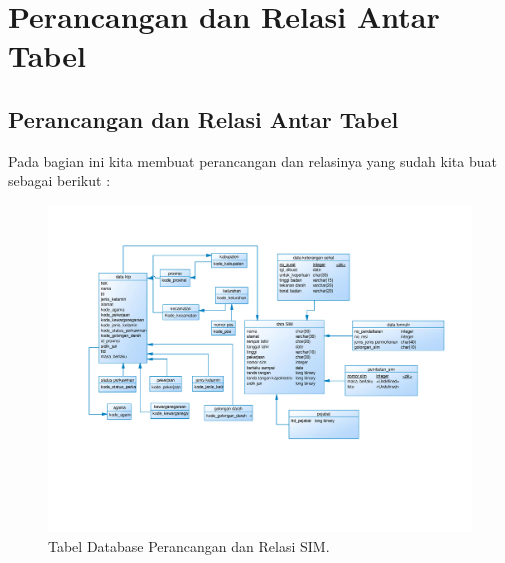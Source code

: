 \chapter{Perancangan dan Relasi Antar Tabel}

\section{Perancangan dan Relasi Antar Tabel}
Pada bagian ini kita membuat perancangan dan relasinya yang sudah kita buat sebagai berikut : 
\begin{figure}[H]
	\centering
	\includegraphics[width=12cm]{figures/relasii.jpg}
	\caption{Tabel Database Perancangan dan Relasi SIM.}
\end{figure}



